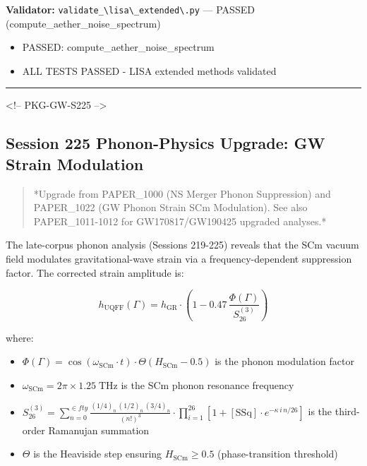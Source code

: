 \documentclass[12pt,a4paper]{article}
\begin{document}
\textbf{Validator:} \texttt{validate\_\textbackslash {lisa\textbackslash \_extended\textbackslash }.py} --- PASSED (compute\_{aether\_noise\_spectrum})

\begin{itemize}
  \item PASSED: compute\_{aether\_noise\_spectrum}
  \item ALL TESTS PASSED - LISA extended methods validated
\end{itemize}

\medskip\hrule\medskip

<!-- PKG-GW-S225 -->

\subsection{Session 225 Phonon-Physics Upgrade: GW Strain Modulation}

\begin{quote}
*Upgrade from PAPER\_1000 (NS Merger Phonon Suppression) and PAPER\_1022
(GW Phonon Strain SCm Modulation). See also PAPER\_1011-1012 for
GW170817/GW190425 upgraded analyses.*
\end{quote}

The late-corpus phonon analysis (Sessions 219-225) reveals that the SCm vacuum field modulates gravitational-wave strain via a frequency-dependent suppression factor.  The corrected strain amplitude is:

\begin{equation}
h_{\text{UQFF}}(\Gamma) = h_{\text{GR}} \cdot \left(1 - 0.47\,\frac{\Phi(\Gamma)}{S_{26}^{(3)}}\right)
\end{equation}

where:

\begin{itemize}
  \item $\Phi(\Gamma) = \cos(\omega_{\text{SCm}} \cdot t) \cdot \Theta(H_{\text{SCm}} - 0.5)$ is the phonon modulation factor
  \item $\omega_{\text{SCm}} = 2\pi \times 1.25\;\text{THz}$ is the SCm phonon resonance frequency
  \item $S_{26}^{(3)} = \sum_{n=0}^{\in fty} \frac{(1/4)_n\,(1/2)_n\,(3/4)_n}{(n!)^3} \cdot \prod_{i=1}^{26}\left[1 + [\text{SSq}]\cdot e^{-\kappa\,i\,n/26}\right]$ is the third-order Ramanujan summation
  \item $\Theta$ is the Heaviside step ensuring $H_{\text{SCm}} \geq 0.5$ (phase-transition threshold)
\end{itemize}
\end{document}
